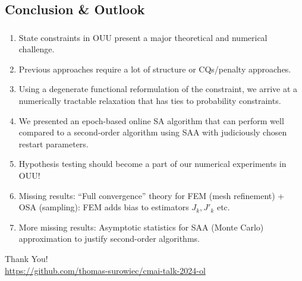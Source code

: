 \documentclass[aspectratio=169,xcolor=dvipsnames,11pt]{beamer}
\begin{document}
\begin{footnotesize}
\section{Conclusion \& Outlook}
\begin{frame}\frametitle{}
\begin{block}{}
\begin{enumerate}
\item State constraints in OUU present a major theoretical and numerical challenge.
\item Previous approaches require a lot of structure or CQs/penalty approaches.
\item Using a degenerate functional reformulation of the constraint, we arrive at a numerically tractable relaxation that has ties to probability constraints.
\item We presented an epoch-based online SA algorithm that can perform well compared to a second-order algorithm using SAA with judiciously chosen restart parameters. 
\item Hypothesis testing should become a part of our numerical experiments in OUU!
\item Missing results: ``Full convergence'' theory for FEM (mesh refinement) + OSA (sampling): FEM adds bias to estimators $J_k, J'_k$ etc.
\item More missing results: Asymptotic statistics for SAA (Monte Carlo) approximation to justify second-order algorithms.
\end{enumerate}
\end{block}\pause
\centering
{\Huge Thank You!}\\
\url{https://github.com/thomas-surowiec/cmai-talk-2024-ol}
\end{frame}

\end{footnotesize}
\end{document}
